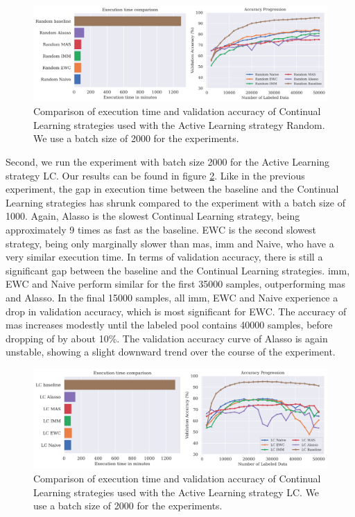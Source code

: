 \begin{figure}[h]
    \centering
    \includegraphics[width=\linewidth]{images/results_CAL/Random_CAL_2000b.png}
    \caption[Continual Active Learning Random 2000 batch size]{Comparison of execution time and validation accuracy of Continual Learning strategies used with the Active Learning strategy
    Random. We use a batch size of 2000 for the experiments.}
    \label{fig:Evaluation:Results:CAL:Random2000}
\end{figure}

Second, we run the experiment with batch size 2000 for the Active Learning strategy LC. Our results can be found in figure \ref{fig:Evaluation:Results:CAL:LC2000}. Like in the previous experiment,
the gap in execution time between the baseline and the Continual Learning strategies has shrunk compared to the experiment with a batch size of 1000. Again, Alasso is the slowest Continual Learning
strategy, being approximately 9 times as fast as the baseline. EWC is the second slowest strategy, being only marginally slower than \gls{mas}, \gls{imm} and Naive, who have a very similar execution time.
In terms of validation accuracy, there is still a significant gap between the baseline and the Continual Learning strategies. \gls{imm}, EWC and Naive perform similar for the first 35000 samples, outperforming
\gls{mas} and Alasso. In the final 15000 samples, all \gls{imm}, EWC and Naive experience a drop in validation accuracy, which is most significant for EWC. The accuracy of \gls{mas} increases modestly until the labeled
pool contains 40000 samples, before dropping of by about 10\%. The validation accuracy curve of Alasso is again unstable, showing a slight downward trend over the course of the experiment. \par

\begin{figure}[h]
    \centering
    \includegraphics[width=\linewidth]{images/results_CAL/LC_CAL_2000b.png}
    \caption[Continual Active Learning LC 2000 batch size]{Comparison of execution time and validation accuracy of Continual Learning strategies used with the Active Learning strategy
    LC. We use a batch size of 2000 for the experiments.}
    \label{fig:Evaluation:Results:CAL:LC2000}
\end{figure}


